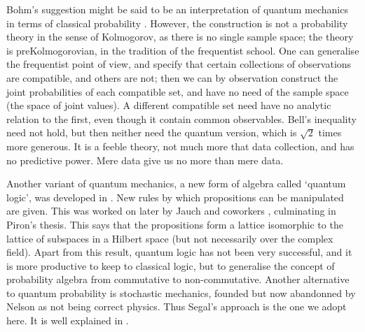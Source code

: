Bohm's suggestion might be said to be an
interpretation of quantum mechanics in terms of classical probability
\cite{Garden}.
However, the construction is not a probability theory in the sense
of Kolmogorov, as there is no single sample space; the theory is
preKolmogorovian, in the tradition of the frequentist school.
One can generalise the frequentist point of view, and specify
that certain collections of observations are
compatible, and others are not; then we can by observation construct
the joint probabilities of each compatible set, and have no need of
the sample space (the space of joint values). A different compatible set
need have no analytic relation to the first, even though it contain
common observables. Bell's inequality need not hold, but then
neither need the quantum version, which is $\surd 2$ times
more generous. It is a feeble theory, not much more that data
collection, and has no predictive power. Mere data give us no
more than mere data.

Another variant of quantum mechanics, a new form of algebra
called `quantum logic', was developed in
\cite{Birkhoff2}. New rules by which propositions can be
manipulated are given. This was worked on later by Jauch and coworkers \cite{Jauch},
culminating in Piron's thesis. This says that the propositions
form a lattice isomorphic to the
lattice of subspaces in a Hilbert space (but not necessarily over the
complex field). Apart from this result, quantum logic has not been very
successful, and it is more productive to keep to
classical logic, but to generalise the concept of probability algebra
from commutative to non-commutative. Another alternative to
quantum probability is stochastic
mechanics, founded but now abandonned by Nelson \cite{Nelson4}
as not being correct physics. Thus Segal's approach is the one we adopt here.
It is well explained in \cite{Emch,Haag,Horuzhy}.

